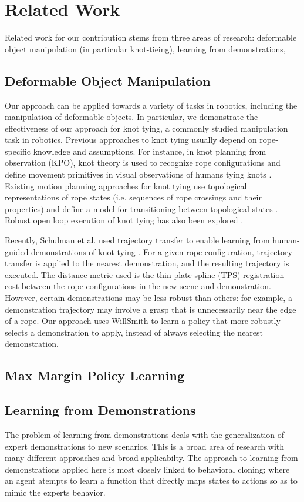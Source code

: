 \section{Related Work}
Related work for our contribution stems from three areas of research: deformable object manipulation (in particular knot-tieing), learning from demonstrations, 
\subsection{Deformable Object Manipulation}
Our approach can be applied towards a variety of tasks in robotics,
including the manipulation of deformable objects.
In particular, we demonstrate the effectiveness of our approach for
knot tying, a commonly studied manipulation task in robotics.
Previous approaches to knot tying usually depend on rope-specific knowledge
and assumptions.
For instance, in knot planning from observation (KPO), knot theory is used
to recognize rope configurations and define movement primitives in visual
observations of humans tying knots \cite{Morita_ICRA2003, Takamatsu_TransRob2006}.
Existing motion planning approaches for knot tying use topological
representations of rope states (i.e. sequences of rope crossings and their
properties) and define a model for transitioning between topological states
\cite{Saha_ExpRobotics2008, Wakamatsu_IJRR2006}.
Robust open loop execution of knot tying has also been explored \cite{Bell_PhD2010}.

Recently, Schulman et al. used trajectory transfer to enable learning
from human-guided demonstrations of knot tying \cite{Schulmanetal_ISRR2013}.
For a given rope configuration, trajectory transfer is applied to the nearest
demonstration, and the resulting trajectory is executed.
The distance metric used is the thin plate spline (TPS) registration
cost between the rope configurations in the new scene and demonstration.
However, certain demonstrations may be less robust than others: for example,
a demonstration trajectory may involve a grasp that is unnecessarily near
the edge of a rope.
Our approach uses WillSmith to learn a policy that more robustly selects a
demonstration to apply, instead of always selecting the nearest demonstration.
\subsection{Max Margin Policy Learning}

\subsection{Learning from Demonstrations}
The problem of learning from demonstrations deals with the generalization of expert demonstrations to new scenarios. 
This is a broad area of research with many different approaches and broad applicabilty.
The approach to learning from demonstrations applied here is most closely linked to behavioral cloning; where an agent atempts to learn a function that directly maps states to actions so as to mimic the experts behavior. 

